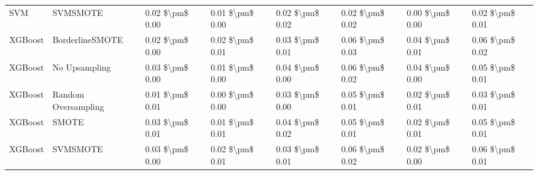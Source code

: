 \begin{tabular}{llllllll}
                            SVM &                      SVMSMOTE & 0.02 \$\textbackslash pm\$ 0.00 &           0.01 \$\textbackslash pm\$ 0.00 &       0.02 \$\textbackslash pm\$ 0.02 &        0.02 \$\textbackslash pm\$ 0.02 &                         0.00 \$\textbackslash pm\$ 0.00 &     0.02 \$\textbackslash pm\$ 0.01 \\
                        XGBoost &               BorderlineSMOTE & 0.02 \$\textbackslash pm\$ 0.00 &           0.02 \$\textbackslash pm\$ 0.01 &       0.03 \$\textbackslash pm\$ 0.01 &        0.06 \$\textbackslash pm\$ 0.03 &                         0.04 \$\textbackslash pm\$ 0.01 &     0.06 \$\textbackslash pm\$ 0.02 \\
                        XGBoost &                 No Upsampling & 0.03 \$\textbackslash pm\$ 0.00 &           0.01 \$\textbackslash pm\$ 0.00 &       0.04 \$\textbackslash pm\$ 0.00 &        0.06 \$\textbackslash pm\$ 0.02 &                         0.04 \$\textbackslash pm\$ 0.00 &     0.05 \$\textbackslash pm\$ 0.01 \\
                        XGBoost &           Random Oversampling & 0.01 \$\textbackslash pm\$ 0.01 &           0.00 \$\textbackslash pm\$ 0.00 &       0.03 \$\textbackslash pm\$ 0.00 &        0.05 \$\textbackslash pm\$ 0.01 &                         0.02 \$\textbackslash pm\$ 0.01 &     0.03 \$\textbackslash pm\$ 0.01 \\
                        XGBoost &                         SMOTE & 0.03 \$\textbackslash pm\$ 0.01 &           0.01 \$\textbackslash pm\$ 0.01 &       0.04 \$\textbackslash pm\$ 0.02 &        0.05 \$\textbackslash pm\$ 0.01 &                         0.02 \$\textbackslash pm\$ 0.01 &     0.05 \$\textbackslash pm\$ 0.01 \\
                        XGBoost &                      SVMSMOTE & 0.03 \$\textbackslash pm\$ 0.00 &           0.02 \$\textbackslash pm\$ 0.01 &       0.03 \$\textbackslash pm\$ 0.01 &        0.06 \$\textbackslash pm\$ 0.02 &                         0.02 \$\textbackslash pm\$ 0.00 &     0.06 \$\textbackslash pm\$ 0.01 \\
\bottomrule
\end{tabular}
